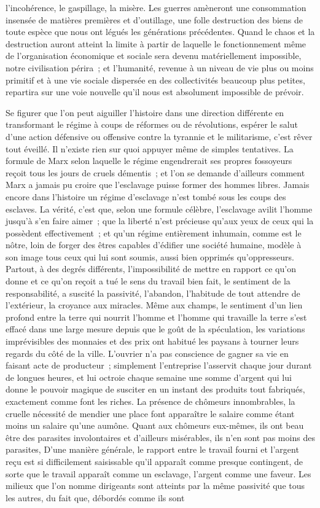 \documentclass[french,twoside]{book} %
\begin{document}
l'incohérence, le gaspillage, la misère. Les guerres amèneront une consommation insensée de matières premières et d'outillage, une folle destruction des biens de toute espèce que nous ont légués les générations précédentes. Quand le chaos et la destruction auront atteint la limite à partir de laquelle le fonctionnement même de l'organisation économique et sociale sera devenu matériellement impossible, notre civilisation périra ; et l'humanité, revenue à un niveau de vie plus ou moins primitif et à une vie sociale dispersée en des collectivités beaucoup plus petites, repartira sur une voie nouvelle qu'il nous est absolument impossible de prévoir.\par
Se figurer que l'on peut aiguiller l'histoire dans une direction différente en transformant le régime à coups de réformes ou de révolutions, espérer le salut d'une action défensive ou offensive contre la tyrannie et le militarisme, c'est rêver tout éveillé. Il n'existe rien sur quoi appuyer même de simples tentatives. La formule de Marx selon laquelle le régime engendrerait ses propres fossoyeurs reçoit tous les jours de cruels démentis ; et l'on se demande d'ailleurs comment Marx a jamais pu croire que l'esclavage puisse former des hommes libres. Jamais encore dans l'histoire un régime d'esclavage n'est tombé sous les coups des esclaves. La vérité, c'est que, selon une formule célèbre, l'esclavage avilit l'homme jusqu'à s'en faire aimer ; que la liberté n'est précieuse qu’aux yeux de ceux qui la possèdent effectivement ; et qu'un régime entièrement inhumain, comme est le nôtre, loin de forger des êtres capables d'édifier une société humaine, modèle à son image tous ceux qui lui sont soumis, aussi bien opprimés qu'oppresseurs. Partout, à des degrés différents, l'impossibilité de mettre en rapport ce qu'on donne et ce qu'on reçoit a tué le sens du travail bien fait, le sentiment de la responsabilité, a suscité la passivité, l'abandon, l'habitude de tout attendre de l'extérieur, la croyance aux miracles. Même aux champs, le sentiment d'un lien profond entre la terre qui nourrit l'homme et l'homme qui travaille la terre s'est effacé dans une large mesure depuis que le goût de la spéculation, les variations imprévisibles des monnaies et des prix ont habitué les paysans à tourner leurs regards du côté de la ville. L'ouvrier n'a pas conscience de gagner sa vie en faisant acte de producteur ; simplement l'entreprise l'asservit chaque jour durant de longues heures, et lui octroie chaque semaine une somme d'argent qui lui donne le pouvoir magique de susciter en un instant des produits tout fabriqués, exactement comme font les riches. La présence de chômeurs innombrables, la cruelle nécessité de mendier une place font apparaître le salaire comme étant moins un salaire qu'une aumône. Quant aux chômeurs eux-mêmes, ils ont beau être des parasites involontaires et d'ailleurs misérables, ils n'en sont pas moins des parasites, D'une manière générale, le rapport entre le travail fourni et l'argent reçu est si difficilement saisissable qu'il apparaît comme presque contingent, de sorte que le travail apparaît comme un esclavage, l'argent comme une faveur. Les milieux que l'on nomme dirigeants sont atteints par la même passivité que tous les autres, du fait que, débordés comme ils sont 
\end{document}
